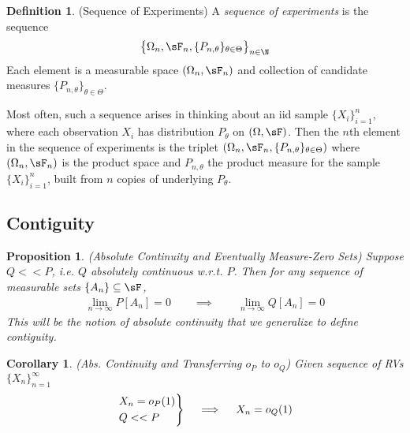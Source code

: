 \documentclass[12pt]{article}
\theoremstyle{plain}
\newtheorem{prop}[thm]{Proposition}
\newtheorem{cor}[thm]{Corollary}
\theoremstyle{definition}
\newtheorem{defn}[thm]{Definition}
\theoremstyle{remark}
\newcommand{\ninf}{_{n=1}^\infty}
\newcommand{\limn}{\lim_{n\rightarrow\infty}}
\begin{document}
\begin{defn}(Sequence of Experiments)
\label{defn:seqexp}
A \emph{sequence of experiments} is the sequence
\begin{align*}
  \big\{\Omega_n,\sF_n,\{P_{n,\theta}\}_{\theta\in  \Theta}
  \big\}_{n\in \N}
\end{align*}
Each element is a measurable space $(\Omega_n,\sF_n)$ and
collection of candidate measures $\{P_{n,\theta}\}_{\theta\in  \Theta}$.

Most often, such a sequence arises in thinking about an iid sample
$\{X_i\}_{i=1}^n$, where each observation $X_i$ has distribution $P_\theta$
on $(\Omega,\sF)$.
Then the $n$th element in the sequence of experiments is the
triplet $(\Omega_n,\sF_n,\{P_{n,\theta}\}_{\theta\in  \Theta})$ where
$(\Omega_n,\sF_n)$ is the product space and $P_{n,\theta}$ the product
measure for the sample $\{X_i\}_{i=1}^n$, built from $n$ copies of
underlying $P_\theta$.
\end{defn}


\clearpage
\subsection{Contiguity}

\begin{prop}
\emph{(Absolute Continuity and Eventually Measure-Zero Sets)}
Suppose $Q<<P$, i.e. $Q$ absolutely continuous w.r.t. $P$.
Then for any sequence of measurable sets $\{A_n\}\subseteq \sF$,
\begin{align*}
  \limn P[A_n] = 0
  \qquad\implies\qquad
  \limn Q[A_n] = 0
\end{align*}
This will be the notion of absolute continuity that we generalize to
define contiguity.
\end{prop}
\begin{cor}
\emph{(Abs. Continuity and Transferring $o_P$ to $o_Q$)}
Given sequence of RVs $\{X_n\}\ninf$
\begin{align*}
  \begin{rcases}
    X_n = o_P(1) \\
    Q<<P \\
  \end{rcases}
  \quad\implies\quad
  X_n=o_Q(1)
\end{align*}
\end{cor}
\end{document}
